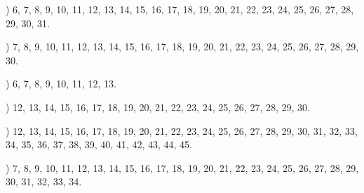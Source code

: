 \documentclass[a4paper,11pt]{article}
\begin{document}
\noindent
{}) 6, 7, 8, 9, 10, 11, 12, 13, 14, 15, 16, 17, 18, 19,
20, 21, 22, 23, 24, 25, 26, 27, 28, 29, 30, 31.

\vspace{\spaceFour}



\noindent
{}) 7, 8, 9, 10, 11, 12, 13, 14, 15, 16, 17, 18, 19, 20,
21, 22, 23, 24, 25, 26, 27, 28, 29, 30.

\vspace{\spaceFour}



\noindent
{}) 6, 7, 8, 9, 10, 11, 12, 13.

\vspace{\spaceFour}



\noindent
{}) 12, 13, 14, 15, 16, 17, 18, 19, 20, 21, 22, 23, 24,
25, 26, 27, 28, 29, 30.

\vspace{\spaceFour}



\noindent
{}) 12, 13, 14, 15, 16, 17, 18, 19, 20, 21, 22, 23, 24,
25, 26, 27, 28, 29, 30, 31, 32, 33, 34, 35, 36, 37, 38, 39, 40, 41,
42, 43, 44, 45.

\vspace{\spaceFour}



\noindent
{}) 7, 8, 9, 10, 11, 12, 13, 14, 15, 16, 17, 18, 19, 20,
21, 22, 23, 24, 25, 26, 27, 28, 29, 30, 31, 32, 33, 34.


\vspace{\spaceTwo}













{}






\end{document}
